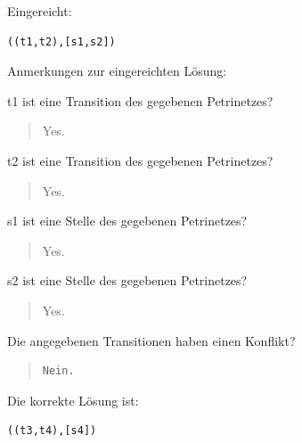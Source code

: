 Eingereicht:


\begin{verbatim}
((t1,t2),[s1,s2])
\end{verbatim}


Anmerkungen zur eingereichten Lösung:

t1 ist eine Transition des gegebenen Petrinetzes?\begin{quote}Yes.\end{quote}t2 ist eine Transition des gegebenen Petrinetzes?\begin{quote}Yes.\end{quote}s1 ist eine Stelle des gegebenen Petrinetzes?\begin{quote}Yes.\end{quote}s2 ist eine Stelle des gegebenen Petrinetzes?\begin{quote}Yes.\end{quote}Die angegebenen Transitionen haben einen Konflikt?

\begin{quote}
\begin{verbatim}
Nein.
\end{verbatim}
\end{quote}

Die korrekte Lösung ist:
\begin{verbatim}
((t3,t4),[s4])
\end{verbatim}


